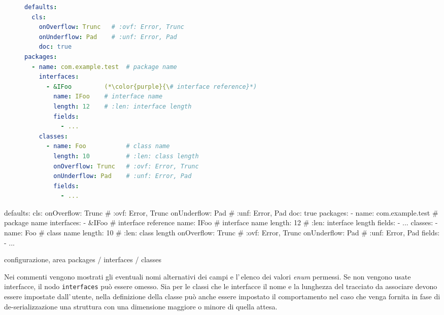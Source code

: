 \ifesource
\begin{figure*}[!htb]
\begin{lstlisting}[language=yaml, 
caption={configurazione, area packages / interfaces / classes}, 
label=lst:pakg-conf]
defaults:
  cls:
    onOverflow: Trunc   # :ovf: Error, Trunc
    onUnderflow: Pad    # :unf: Error, Pad
    doc: true
packages:
  - name: com.example.test  # package name
    interfaces:
      - &IFoo         (*\color{purple}{\# interface reference}*)
        name: IFoo    # interface name
        length: 12    # :len: interface length
        fields:
          - ...
    classes:
      - name: Foo           # class name
        length: 10          # :len: class length
        onOverflow: Trunc   # :ovf: Error, Trunc
        onUnderflow: Pad    # :unf: Error, Pad
        fields:
          - ...
\end{lstlisting}
\end{figure*}
\else
\begin{elisting}[!htb]
\begin{yamlcode}
defaults:
  cls:
    onOverflow: Trunc   # :ovf: Error, Trunc
    onUnderflow: Pad    # :unf: Error, Pad
    doc: true
packages:
  - name: com.example.test  # package name
    interfaces:
      - &IFoo         # interface reference
        name: IFoo    # interface name
        length: 12    # :len: interface length
        fields:
          - ...
    classes:
      - name: Foo           # class name
        length: 10          # :len: class length
        onOverflow: Trunc   # :ovf: Error, Trunc
        onUnderflow: Pad    # :unf: Error, Pad
        fields:
          - ...
\end{yamlcode}
\caption{configurazione, area packages / interfaces / classes}
\label{lst:pakg-conf}
\end{elisting}
\fi
Nei commenti vengono mostrati gli eventuali nomi alternativi dei campi e 
l'\,elenco dei valori \textsl{enum} permessi.
Se non vengono usate interfacce, il nodo \texttt{interfaces} può essere omesso.
Sia per le classi che le interfacce il nome e la lunghezza del tracciato da 
associare devono essere impostate dall'\,utente, nella definizione della classe
può anche essere impostato il comportamento nel caso che venga fornita in fase
di de-serializzazione una struttura con una dimensione maggiore o minore di 
quella attesa.

